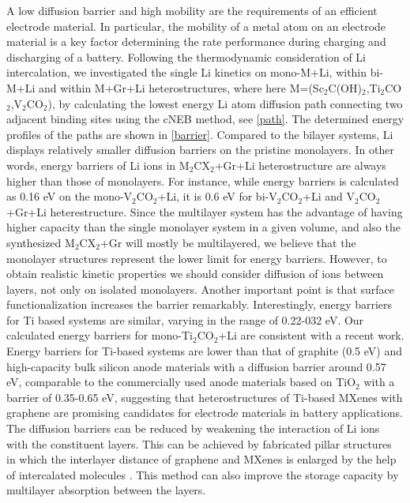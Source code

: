 A low diffusion barrier and high mobility are the requirements of an efficient electrode material. In particular, the mobility of a metal atom on an electrode material is a key factor determining the rate performance during charging and discharging of a battery. Following the thermodynamic consideration of Li intercalation, we investigated the single Li kinetics on mono-M+Li, within bi-M+Li and within M+Gr+Li heterostructures, where here M=(Sc$_2$C(OH)$_2$,Ti$_2$CO$_2$,V$_2$CO$_2$), by calculating the lowest energy Li atom diffusion path connecting two adjacent binding sites using the cNEB method, see \autoref{path}. The determined energy profiles of the paths are shown in \autoref{barrier}. 
Compared to the bilayer systems, Li displays relatively smaller diffusion barriers on the pristine monolayers. In other words, energy barriers of Li ions in M$_2$CX$_2$+Gr+Li heterostructure are always higher than those of monolayers. For instance, while energy barriers is calculated as 0.16 eV on the mono-V$_2$CO$_2$+Li, it is 0.6 eV for bi-V$_2$CO$_2$+Li and V$_2$CO$_2$+Gr+Li heterestructure. Since the multilayer system has the advantage of having higher capacity than the single monolayer system in a given volume, and also the synthesized M$_2$CX$_2$+Gr will mostly be multilayered, we believe that the monolayer structures represent the lower limit for energy barriers. However, to obtain realistic kinetic properties we should consider diffusion of ions between layers, not only on isolated monolayers. Another important point is that surface functionalization increases the barrier remarkably\cite{doi:10.1021/jp504493a}. Interestingly, energy barriers for Ti based systems are similar, varying in the range of 0.22-032 eV.  Our calculated energy barriers for mono-Ti$_2$CO$_2$+Li are consistent with a recent work\cite{doi:10.1021/jp504493a}. Energy barriers for Ti-based systems are lower than that of graphite (0.5 eV)\cite{Thinius2014} and high-capacity bulk silicon anode materials with a diffusion barrier around 0.57 eV, comparable to the commercially used anode materials based on TiO$_2$ with a barrier of 0.35-0.65 eV\cite{tio2-barrier,tio2-barrier-4,tio2-barrier-3}, suggesting that heterostructures of Ti-based MXenes with graphene are promising candidates for electrode materials in battery applications. The diffusion barriers can be reduced by weakening the interaction of Li ions with the constituent layers. This can be achieved by fabricated pillar structures in which the interlayer distance of graphene and MXenes is enlarged by the help of intercalated molecules \cite{Luo2017}. This method can also improve the storage capacity by multilayer absorption between the layers. 




